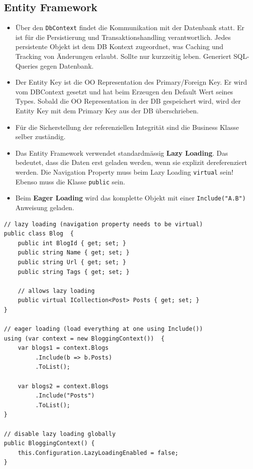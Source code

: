 \documentclass[
a4paper,
oneside,
10pt,
fleqn,
headsepline,
toc=listofnumbered, 
bibliography=totocnumbered]{scrartcl}
\begin{document}
\clearpage

\subsection{Entity Framework}
\begin{itemize}
	\item Über den \lstinline|DbContext| findet die Kommunikation mit der Datenbank statt. Er ist für die Persistierung und Transaktionshandling verantwortlich. Jedes persistente Objekt ist dem DB Kontext zugeordnet, was Caching und Tracking von Änderungen erlaubt. Sollte nur kurzzeitig leben. Generiert SQL-Queries gegen Datenbank.
	\item Der Entity Key ist die OO Representation des Primary/Foreign Key. Er wird vom DBContext gesetzt und hat beim Erzeugen den Default Wert seines Types. Sobald die OO Representation in der DB gespeichert wird, wird der Entity Key mit dem Primary Key aus der DB überschrieben.
	\item Für die Sicherstellung der referenziellen Integrität sind die Business Klasse selber zuständig.
	\item Das Entity Framework verwendet standardmässig \textbf{Lazy Loading}. Das bedeutet, dass die Daten erst geladen werden, wenn sie explizit dereferenziert werden. Die Navigation Property muss beim Lazy Loading \lstinline|virtual| sein! Ebenso muss die Klasse \lstinline|public| sein.
	\item Beim \textbf{Eager Loading} wird das komplette Objekt mit einer \lstinline|Include("A.B")| Anweisung geladen.
\end{itemize}

\begin{lstlisting}
// lazy loading (navigation property needs to be virtual)
public class Blog  {  
	public int BlogId { get; set; }  
	public string Name { get; set; }  
	public string Url { get; set; }  
	public string Tags { get; set; }  
	
	// allows lazy loading
	public virtual ICollection<Post> Posts { get; set; }  
}

// eager loading (load everything at one using Include())
using (var context = new BloggingContext())  {
	var blogs1 = context.Blogs 
		 .Include(b => b.Posts) 
		 .ToList(); 
	
	var blogs2 = context.Blogs 
		 .Include("Posts") 
		 .ToList();
}

// disable lazy loading globally
public BloggingContext() { 
	this.Configuration.LazyLoadingEnabled = false; 
} 
\end{lstlisting}
\end{document}
